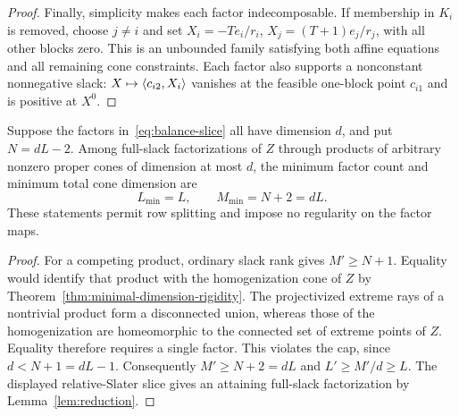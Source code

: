 \begin{proof}
Finally, simplicity makes each factor indecomposable.  If membership
in $K_i$ is removed, choose $j\ne i$ and set
$X_i=-Te_i/r_i$, $X_j=(T+1)e_j/r_j$, with all other blocks zero.
This is an unbounded family satisfying both affine equations and
all remaining cone constraints.  Each factor also supports a
nonconstant nonnegative slack: $X\mapsto\langle c_{i2},X_i\rangle$ vanishes
at the feasible one-block point $c_{i1}$ and is positive at $X^0$.
\end{proof}

\begin{corollary}\label{cor:balance-cap}
Suppose the factors in~\eqref{eq:balance-slice} all have dimension $d$,
and put $N=dL-2$.  Among full-slack factorizations of $Z$ through products
of arbitrary nonzero proper cones of dimension at most $d$, the minimum
factor count and minimum total cone dimension are
\[
 L_{\min}=L,\qquad M_{\min}=N+2=dL.
\]
These statements permit row splitting and impose no regularity on the
factor maps.
\end{corollary}
\begin{proof}
For a competing product, ordinary slack rank gives $M'\geq N+1$.
Equality would identify that product with the homogenization cone of
$Z$ by Theorem~\ref{thm:minimal-dimension-rigidity}.
The projectivized extreme rays of a nontrivial product form a
disconnected union, whereas those of the homogenization are
homeomorphic to the connected set of extreme points of $Z$.
Equality therefore requires a single factor.  This violates the cap,
since $d<N+1=dL-1$.  Consequently $M'\geq N+2=dL$ and
$L'\geq M'/d\geq L$.  The displayed relative-Slater slice gives
an attaining full-slack factorization by Lemma~\ref{lem:reduction}.
\end{proof}

